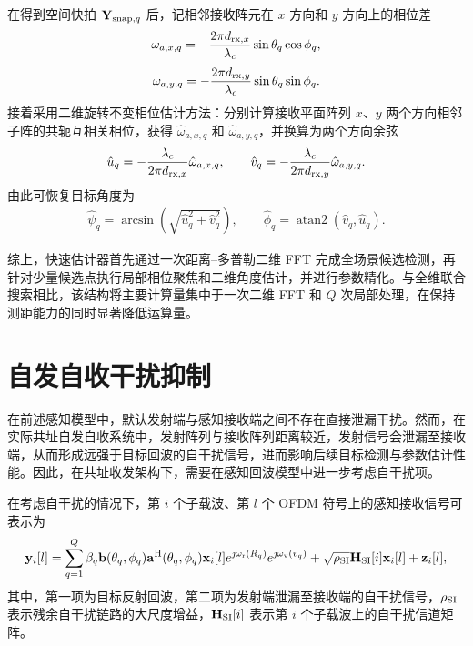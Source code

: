 \documentclass[onecolumn,10pt]{IEEEtran}
\begin{document}
在得到空间快拍 $\mathbf{Y}_{{\rm snap},q}$ 后，记相邻接收阵元在 $x$ 方向和 $y$ 方向上的相位差
\begin{align}
    \omega_{a,x,q}
    =
    -\frac{2\pi d_{{\rm rx},x}}{\lambda_c}
    \sin\theta_q\cos\phi_q,
\end{align}
\begin{align}
    \omega_{a,y,q}
    =
    -\frac{2\pi d_{{\rm rx},y}}{\lambda_c}
    \sin\theta_q\sin\phi_q.
\end{align}
接着采用二维旋转不变相位估计方法：分别计算接收平面阵列 $x$、$y$ 两个方向相邻子阵的共轭互相关相位，获得
$\hat{\omega}_{a,x,q}$ 和 $\hat{\omega}_{a,y,q}$，并换算为两个方向余弦
\begin{align}
    \hat u_q
    =
    -\frac{\lambda_c}{2\pi d_{{\rm rx},x}}
    \hat{\omega}_{a,x,q},
    \qquad
    \hat v_q
    =
    -\frac{\lambda_c}{2\pi d_{{\rm rx},y}}
    \hat{\omega}_{a,y,q}.
\end{align}
由此可恢复目标角度为
\begin{align}
    \hat{\psi}_q
    =
    \arcsin
    \left(
    \sqrt{\hat u_q^2+\hat v_q^2}
    \right),
    \qquad
    \hat{\phi}_q
    =
    \operatorname{atan2}(\hat v_q,\hat u_q).
\end{align}
    
综上，快速估计器首先通过一次距离--多普勒二维 FFT 完成全场景候选检测，再针对少量候选点执行局部相位聚焦和二维角度估计，并进行参数精化。与全维联合搜索相比，该结构将主要计算量集中于一次二维 FFT 和 $Q$ 次局部处理，在保持测距能力的同时显著降低运算量。

\section{自发自收干扰抑制}

在前述感知模型中，默认发射端与感知接收端之间不存在直接泄漏干扰。然而，在实际共址自发自收系统中，发射阵列与接收阵列距离较近，发射信号会泄漏至接收端，从而形成远强于目标回波的自干扰信号，进而影响后续目标检测与参数估计性能。因此，在共址收发架构下，需要在感知回波模型中进一步考虑自干扰项。

在考虑自干扰的情况下，第 $i$ 个子载波、第 $l$ 个 OFDM 符号上的感知接收信号可表示为
\begin{align}
    \mathbf{y}_i[l]
    =
    \sum_{q=1}^{Q}
    \beta_q
    \mathbf{b}(\theta_q,\phi_q)
    \mathbf{a}^{\rm H}(\theta_q,\phi_q)
    \mathbf{x}_i[l]
    e^{\jmath \omega_{\rm r}(R_q)}
    e^{\jmath \omega_{\rm v}(v_q)}
    +
    \sqrt{\rho_{\rm SI}}
    \mathbf{H}_{\rm SI}[i]
    \mathbf{x}_i[l]
    +
    \mathbf{z}_i[l],
\end{align}
其中，第一项为目标反射回波，第二项为发射端泄漏至接收端的自干扰信号，$\rho_{\rm SI}$ 表示残余自干扰链路的大尺度增益，$\mathbf{H}_{\rm SI}[i]$ 表示第 $i$ 个子载波上的自干扰信道矩阵。
\end{document}
